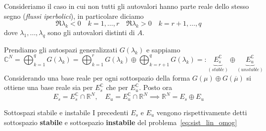Consideriamo il caso in cui non tutti gli autovalori hanno parte reale dello
stesso segno (\emph{flussi iperbolici}), in particolare diciamo
\[
  \Re \lambda_{k} < 0 \quad k = 1, \dots, r \quad \Re \lambda_{k} > 0 \quad k =
  r+1, \dots, q
\]
dove \(\lambda_{1}, \dots, \lambda_q\) sono gli autovalori distinti di \(A\).

Prendiamo gli autospazi generalizzati \(G{(\lambda_{k})}\) e sappiamo
\[
    \mathbb{C}^{N} = \bigoplus_{k=1}^{q} G{(\lambda_{k})} = \bigoplus_{k=1}^{r}
    G{(\lambda_{k})} \oplus \bigoplus_{k=r+1}^{q} G{(\lambda_{k})} =:
    \underbrace{E^{\mathbb{C}}_s}_{(stable)}  \oplus
    \underbrace{E^{\mathbb{C}}_u}_{(unstable)} 
\]
Considerando una base reale per ogni sottospazio della forma \(G(\mu) \oplus
G{(\overline{\mu})}\) si ottiene una base reale sia per \(E^{\mathbb{C}}_s\) che
per \(E^{\mathbb{C}}_u\). Posto ora
\[
    E_s = E^{\mathbb{C}}_s \cap \mathbb{R}^{N}, \quad E_u = E^{\mathbb{C}}_u
    \cap \mathbb{R}^{N} \implies \mathbb{R}^{N} = E_s \oplus E_u
\]
\begin{definition}{Sottospazi stabile e instabile}
    I precedenti \(E_s\) e \(E_u\) vengono rispettivamente detti sottospazio
    \textbf{stabile} e sottospazio \textbf{instabile} del
    problema~\eqref{eq:sist_lin_omog}
\end{definition}
